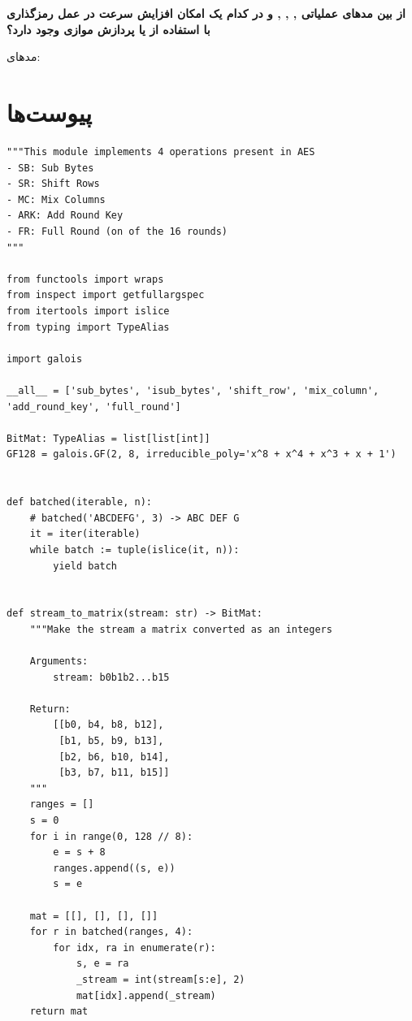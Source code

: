 \documentclass[dvipsnames, svgnames, x11names]{article}
\begin{document}
\section{}
{\large \textbf{از بین مدهای عملیاتی
,
,
,
و
در کدام یک امکان افزایش سرعت در عمل رمزگذاری با استفاده از
یا پردازش موازی وجود دارد؟}}

مدهای:
\begin{inparaitem}
\item {}
\item {}
\end{inparaitem}

\section{پیوست‌ها}
\begin{latin}
\begin{lstlisting}
"""This module implements 4 operations present in AES
- SB: Sub Bytes
- SR: Shift Rows
- MC: Mix Columns
- ARK: Add Round Key
- FR: Full Round (on of the 16 rounds)
"""

from functools import wraps
from inspect import getfullargspec
from itertools import islice
from typing import TypeAlias

import galois

__all__ = ['sub_bytes', 'isub_bytes', 'shift_row', 'mix_column', 'add_round_key', 'full_round']

BitMat: TypeAlias = list[list[int]]
GF128 = galois.GF(2, 8, irreducible_poly='x^8 + x^4 + x^3 + x + 1')


def batched(iterable, n):
    # batched('ABCDEFG', 3) -> ABC DEF G
    it = iter(iterable)
    while batch := tuple(islice(it, n)):
        yield batch


def stream_to_matrix(stream: str) -> BitMat:
    """Make the stream a matrix converted as an integers

    Arguments:
        stream: b0b1b2...b15

    Return:
        [[b0, b4, b8, b12],
         [b1, b5, b9, b13],
         [b2, b6, b10, b14],
         [b3, b7, b11, b15]]
    """
    ranges = []
    s = 0
    for i in range(0, 128 // 8):
        e = s + 8
        ranges.append((s, e))
        s = e

    mat = [[], [], [], []]
    for r in batched(ranges, 4):
        for idx, ra in enumerate(r):
            s, e = ra
            _stream = int(stream[s:e], 2)
            mat[idx].append(_stream)
    return mat



\end{lstlisting}
\end{latin}
\end{document}
